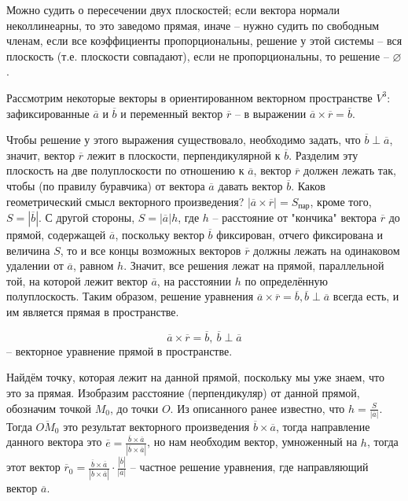 	\begin{Rem}
		Можно судить о пересечении двух плоскостей; если вектора нормали неколлинеарны, то это заведомо прямая, иначе -- нужно судить по свободным членам, 
		если все коэффициенты пропорциональны, решение у этой системы -- вся плоскость (т.е. плоскости совпадают), если не пропорциональны, то решение -- $\varnothing$.
	\end{Rem}

	Рассмотрим некоторые векторы в ориентированном векторном пространстве $V^3$: зафиксированные $\overline{a}$ и $\overline{b}$ и переменный вектор $\overline{r}$ -- 
	в выражении $\overline{a}\times \overline{r} = \overline{b}$. 
	
	\begin{figure}[h]
		\centering
		\def\svgwidth{0.35\columnwidth}
		
	\end{figure}

	Чтобы решение у этого выражения существовало, необходимо задать, что $\overline{b} \perp \overline{a}$, 
	значит, вектор $\overline{r}$ лежит в плоскости, перпендикулярной к $\overline{b}$. Разделим эту плоскость на две полуплоскости по отношению к $\overline{a}$, 
	вектор $\overline{r}$ должен лежать так, чтобы (по правилу буравчика) от вектора $\overline{a}$ давать вектор $\overline{b}$. 
	Каков геометрический смысл векторного произведения? $|\overline{a} \times \overline{r}| = S_{\text{пар}}$, кроме того, $S = |\overline{b}|$. 
	С другой стороны, $S = |\overline{a}| h$, где $h$ -- расстояние от "кончика" вектора $\overline{r}$ до прямой, содержащей $\overline{a}$, поскольку вектор $\overline{b}$ фиксирован,
	отчего фиксирована и величина $S$, то и все концы возможных векторов $\overline{r}$ должны лежать на одинаковом удалении от $\overline{a}$, равном $h$. 
	Значит, все решения лежат на прямой, параллельной той, на которой лежит вектор $\overline{a}$, на расстоянии $h$ по определённую полуплоскость.
	Таким образом, решение уравнения $\overline{a}\times \overline{r} = \overline{b}, \overline{b} \perp \overline{a}$ всегда есть, и им является прямая в пространстве.\\ 
	
	\begin{Def}
		$$\overline{a} \times \overline{r} = \overline{b}, \ \overline{b} \perp \overline{a}$$ -- векторное уравнение прямой в пространстве.
	\end{Def}

	Найдём точку, которая лежит на данной прямой, поскольку мы уже знаем, что это за прямая.
	Изобразим расстояние (перпендикуляр) от данной прямой, обозначим точкой $M_0$, до точки $O$. Из описанного ранее известно, что $h = \frac{S}{|\overline{a}|}$. 
	Тогда $\overline{OM_0}$ это результат векторного произведения $\overline{b} \times \overline{a}$, тогда направление данного вектора это $\overline{e} = \frac{\overline{b} \times \overline{a}}{|\overline{b} \times \overline{a}|}$,
	но нам необходим вектор, умноженный на $h$, тогда этот вектор $\overline{r}_0 = \frac{\overline{b} \times \overline{a}}{|\overline{b} \times \overline{a}|} \cdot \frac{|\overline{b}|}{|\overline{a}|}$ -- частное решение уравнения, где направляющий вектор $\overline{a}$. 

